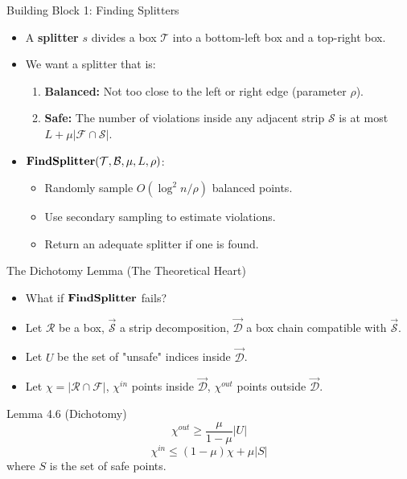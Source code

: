 \documentclass[11pt,aspectratio=169]{beamer}
\newcommand{\findsplitter}{{\rm {\bf FindSplitter}}}
\begin{document}
\begin{frame}{Building Block 1: Finding Splitters}
    \begin{itemize}
        \item A \textbf{splitter} $s$ divides a box $\mathcal{T}$ into a bottom-left box and a top-right box.
        \item We want a splitter that is:
        \begin{enumerate}
            \item \textbf{Balanced:} Not too close to the left or right edge (parameter $\rho$).
            \item \textbf{Safe:} The number of violations inside any adjacent strip $\mathcal{S}$ is at most $L + \mu |\mathcal{F} \cap \mathcal{S}|$.
        \end{enumerate}
        \item $\findsplitter(\mathcal{T}, \mathcal{B}, \mu, L, \rho)$:
        \begin{itemize}
            \item Randomly sample $O(\log^2 n / \rho)$ balanced points.
            \item Use secondary sampling to estimate violations.
            \item Return an adequate splitter if one is found.
        \end{itemize}
    \end{itemize}
\end{frame}

\begin{frame}{The Dichotomy Lemma (The Theoretical Heart)}
    \begin{itemize}
        \item What if $\findsplitter$ fails?
        \item Let $\mathcal{R}$ be a box, $\vec{\mathcal{S}}$ a strip decomposition, $\vec{\mathcal{D}}$ a box chain compatible with $\vec{\mathcal{S}}$.
        \item Let $U$ be the set of "unsafe" indices inside $\vec{\mathcal{D}}$.
        \item Let $\chi = |\mathcal{R} \cap \mathcal{F}|$, $\chi^{in}$ points inside $\vec{\mathcal{D}}$, $\chi^{out}$ points outside $\vec{\mathcal{D}}$.
    \end{itemize}
    \begin{block}{Lemma 4.6 (Dichotomy)}
        $$\chi^{out} \geq \frac{\mu}{1-\mu} |U|$$
        $$\chi^{in} \leq (1-\mu)\chi + \mu |S|$$
        where $S$ is the set of safe points.
    \end{block}
\end{frame}
\end{document}
